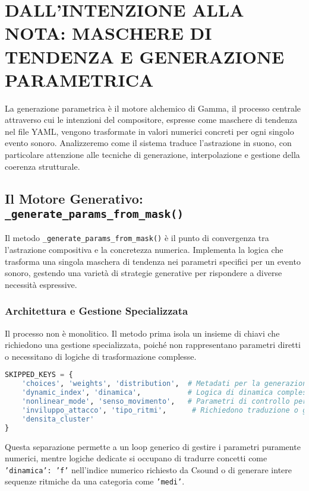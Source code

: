 
\section{DALL'INTENZIONE ALLA NOTA: MASCHERE DI TENDENZA E GENERAZIONE PARAMETRICA}
La generazione parametrica è il motore alchemico di Gamma, il processo centrale attraverso cui le intenzioni del compositore, espresse come  maschere di tendenza  nel file YAML, vengono trasformate in valori numerici concreti per ogni singolo evento sonoro. Analizzeremo come il sistema traduce l'astrazione in suono, con particolare attenzione alle tecniche di generazione, interpolazione e gestione della coerenza strutturale.
\subsection{Il Motore Generativo: \texttt{\_generate\_params\_from\_mask()}}
Il metodo \texttt{\_generate\_params\_from\_mask()} è il punto di convergenza tra l'astrazione compositiva e la concretezza numerica. Implementa la logica che trasforma una singola maschera di tendenza nei parametri specifici per un evento sonoro, gestendo una varietà di strategie generative per rispondere a diverse necessità espressive.
\subsubsection{Architettura e Gestione Specializzata}
Il processo non è monolitico. Il metodo prima isola un insieme di chiavi che richiedono una gestione specializzata, poiché non rappresentano parametri diretti o necessitano di logiche di trasformazione complesse.

\begin{lstlisting}[language=Python]
SKIPPED_KEYS = {
    'choices', 'weights', 'distribution',  # Metadati per la generazione
    'dynamic_index', 'dinamica',           # Logica di dinamica complessa
    'nonlinear_mode', 'senso_movimento',   # Parametri di controllo per Csound
    'inviluppo_attacco', 'tipo_ritmi',      # Richiedono traduzione o generazione complessa
    'densita_cluster'                      
}
\end{lstlisting}
Questa separazione permette a un loop generico di gestire i parametri puramente numerici, mentre logiche dedicate si occupano di tradurre concetti come \texttt{'dinamica': 'f'} nell'indice numerico richiesto da Csound o di generare intere sequenze ritmiche da una categoria come \texttt{'medi'}.
